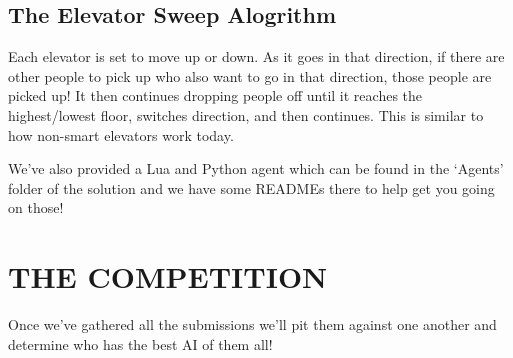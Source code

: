 \documentclass{article}
\begin{document}
\subsection*{The Elevator Sweep Alogrithm}
Each elevator is set to move up or down. As it goes in that direction, if there are other people to pick up who also want to go in that direction, those people are picked up! It then continues dropping people off until it reaches the highest/lowest floor, switches direction, and then continues. This is similar to how non-smart elevators work today.

We've also provided a Lua and Python agent which can be found in the `Agents' folder of the solution and we have some READMEs there to help get you going on those!

\section*{THE COMPETITION}
Once we've gathered all the submissions we'll pit them against one another and determine who has the best AI of them all!
\end{document}
